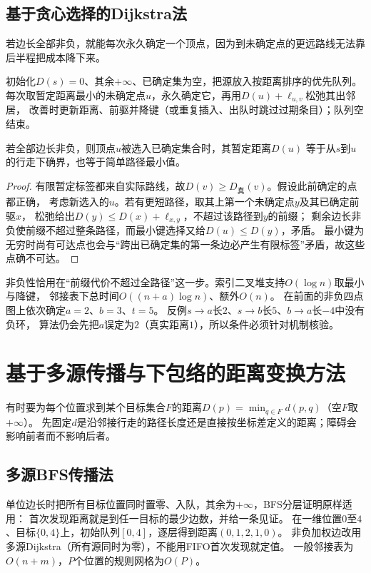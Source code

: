 \subsection{基于贪心选择的Dijkstra法}

若边长全部非负，就能每次永久确定一个顶点，因为到未确定点的更远路线无法靠后半程把成本降下来。
\begin{algorithm}[Dijkstra]
  初始化$D(s)=0$、其余$+\infty$、已确定集为空，把源放入按距离排序的优先队列。
  每次取暂定距离最小的未确定点$u$，永久确定它，再用$D(u)+\ell_{u,v}$松弛其出邻居，
  改善时更新距离、前驱并降键（或重复插入、出队时跳过过期条目）；队列空结束。
\end{algorithm}

\begin{theorem}[Dijkstra算法的贪心正确性]
  \label{thm:graph-theory-dijkstra-correctness}
  若全部边长非负，则顶点$u$被选入已确定集合时，其暂定距离$D(u)$
  等于从$s$到$u$的行走下确界，也等于简单路径最小值。
\end{theorem}
\begin{proof}
有限暂定标签都来自实际路线，故$D(v)\geq D_{\text{真}}(v)$。假设此前确定的点都正确，
考虑新选入的$u$。若有更短路径，取其上第一个未确定点$y$及其已确定前驱$x$，
松弛给出$D(y)\leq D(x)+\ell_{x,y}$，不超过该路径到$y$的前缀；
剩余边长非负使前缀不超过整条路径，而最小键选择又给$D(u)\leq D(y)$，矛盾。
最小键为无穷时尚有可达点也会与“跨出已确定集的第一条边必产生有限标签”矛盾，故这些点确不可达。
\end{proof}
非负性恰用在“前缀代价不超过全路径”这一步。索引二叉堆支持$O(\log n)$取最小与降键，
邻接表下总时间$O((n+a)\log n)$、额外$O(n)$。
在前面的非负四点图上依次确定$a=2$、$b=3$、$t=5$。
反例$s\to a$长$2$、$s\to b$长$5$、$b\to a$长$-4$中没有负环，
算法仍会先把$a$误定为$2$（真实距离$1$），所以条件必须针对机制核验。

\section{基于多源传播与下包络的距离变换方法}

有时要为每个位置求到某个目标集合$F$的距离$D(p)=\min_{q\in F}d(p,q)$（空$F$取$+\infty$）。
先固定$d$是沿邻接行走的路径长度还是直接按坐标差定义的距离；障碍会影响前者而不影响后者。

\subsection{多源BFS传播法}
单位边长时把所有目标位置同时置零、入队，其余为$+\infty$，BFS分层证明原样适用：
首次发现距离就是到任一目标的最少边数，并给一条见证。
在一维位置$0$至$4$、目标$\{0,4\}$上，初始队列$[0,4]$，逐层得到距离$(0,1,2,1,0)$。
非负加权边改用多源Dijkstra（所有源同时为零），不能用FIFO首次发现就定值。
一般邻接表为$O(n+m)$，$P$个位置的规则网格为$O(P)$。

